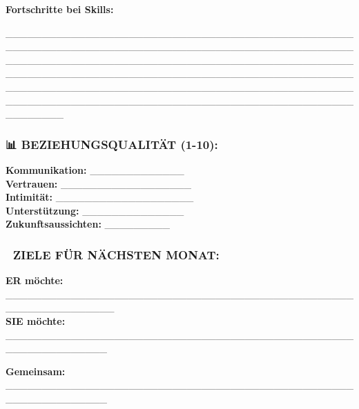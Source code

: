 \textbf{Fortschritte bei Skills:}

\_\_\_\_\_\_\_\_\_\_\_\_\_\_\_\_\_\_\_\_\_\_\_\_\_\_\_\_\_\_\_\_\_\_\_\_\_\_\_\_\_\_\_\_\_\_\_\_\_\_\_\_\_\_\_\_\_\_\_\_\_\_\_\_\_\_\_\_\_\_\_\_\_\_\_\_\_\_\_\_\_\_\_\_\_\_\_\_\_\_\_\_\_\_\_\_\_\_\_\_\_\_\_\_\_\_\_\_\_\_\_\_\_\_\_\_\_\_\_\_\_\_\_\_\_\_\_\_\_\_\_\_\_\_\_\_\_\_\_\_\_\_\_\_\_\_\_\_\_\_\_\_\_\_\_\_\_\_\_\_\_\_\_\_\_\_\_\_\_\_\_\_\_\_\_\_\_\_\_\_\_\_\_\_\_\_\_\_\_\_\_\_\_\_\_\_\_\_\_\_\_\_\_\_\_\_\_\_\_\_\_\_\_\_\_\_\_\_\_\_\_\_\_\_\_\_\_\_\_\_\_\_\_\_\_\_\_\_\_\_\_\_\_\_\_\_\_\_\_\_\_\_\_\_\_\_\_\_\_\_\_\_\_\_\_\_\_\_\_\_\_\_\_\_\_\_\_\_\_\_\_\_\_\_\_\_\_\_\_\_\_\_\_\_\_\_

\hypertarget{beziehungsqualituxe4t-1-10}{%
\subsubsection{\texorpdfstring{\textbf{📊 BEZIEHUNGSQUALITÄT (1-10):}}{📊 BEZIEHUNGSQUALITÄT (1-10):}}\label{beziehungsqualituxe4t-1-10}}

\textbf{Kommunikation:} \_\_\_\_\_\_\_\_\_\_\_\_\_\\
\textbf{Vertrauen:} \_\_\_\_\_\_\_\_\_\_\_\_\_\_\_\_\_\_\\
\textbf{Intimität:} \_\_\_\_\_\_\_\_\_\_\_\_\_\_\_\_\_\_\_\\
\textbf{Unterstützung:} \_\_\_\_\_\_\_\_\_\_\_\_\_\_\\
\textbf{Zukunftsaussichten:} \_\_\_\_\_\_\_\_\_

\hypertarget{section-11}{%
\subsubsection{}\label{section-11}}

\hypertarget{ziele-fuxfcr-nuxe4chsten-monat}{%
\subsubsection{\texorpdfstring{\textbf{🎯 ZIELE FÜR NÄCHSTEN MONAT:}}{🎯 ZIELE FÜR NÄCHSTEN MONAT:}}\label{ziele-fuxfcr-nuxe4chsten-monat}}

\textbf{ER möchte:} \_\_\_\_\_\_\_\_\_\_\_\_\_\_\_\_\_\_\_\_\_\_\_\_\_\_\_\_\_\_\_\_\_\_\_\_\_\_\_\_\_\_\_\_\_\_\_\_\_\_\_\_\_\_\_\_\_\_\_\_\_\_\_\\
\textbf{SIE möchte:} \_\_\_\_\_\_\_\_\_\_\_\_\_\_\_\_\_\_\_\_\_\_\_\_\_\_\_\_\_\_\_\_\_\_\_\_\_\_\_\_\_\_\_\_\_\_\_\_\_\_\_\_\_\_\_\_\_\_\_\_\_\_

\textbf{Gemeinsam:} \_\_\_\_\_\_\_\_\_\_\_\_\_\_\_\_\_\_\_\_\_\_\_\_\_\_\_\_\_\_\_\_\_\_\_\_\_\_\_\_\_\_\_\_\_\_\_\_\_\_\_\_\_\_\_\_\_\_\_\_\_\_

